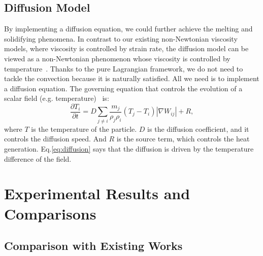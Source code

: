 \documentclass[10pt,journal,compsoc]{IEEEtran}
\begin{document}
\subsection{Diffusion Model}\label{sec:diffusion}
By implementing a diffusion equation, we could further achieve the melting and solidifying phenomena. In contrast to our existing non-Newtonian viscosity models, where viscosity is controlled by strain rate, the diffusion model can be viewed as a non-Newtonian phenomenon whose viscosity is controlled by temperature~\cite{GAO2017anefficient,Su2021}. Thanks to the pure Lagrangian framework, we do not need to tackle the convection because it is naturally satisfied. All we need is to implement a diffusion equation. The governing equation that controls the evolution of a scalar field (e.g. temperature)~\cite{Cleary1999-ConductionSPH, Orthmann2012-Diffusion} is:
\begin{equation}
	\frac{\partial T_i}{\partial t}=D \sum_{j \neq i} \frac{m_j}{\rho_j \rho_i}\left(T_j-T_i\right)\left|\nabla W_{i j}\right|+R,\label{eq:diffusion}
\end{equation}
where $T$ is the temperature of the particle. $D$ is the diffusion coefficient, and it controls the diffusion speed. And $R$ is the source term, which controls the heat generation. Eq.\ref{eq:diffusion} says that the diffusion is driven by the temperature difference of the field.



\section{Experimental Results and Comparisons}

\subsection{Comparison with Existing Works}
\end{document}

